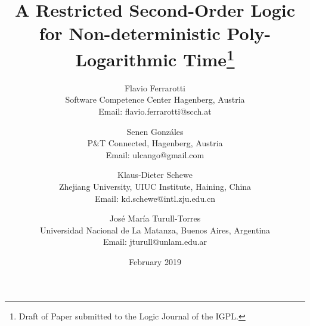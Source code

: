 \documentclass{article}
\begin{document}
\title{A Restricted Second-Order Logic for Non-deterministic Poly-Logarithmic Time\footnote{Draft of Paper submitted to the Logic Journal of the IGPL.}}


\author{Flavio Ferrarotti\\
Software Competence Center Hagenberg, Austria \\
Email: flavio.ferrarotti@scch.at\\
\and
Senen Gonz\'{a}les\\
P\&T Connected, Hagenberg, Austria \\
Email: ulcango@gmail.com\\
\and
Klaus-Dieter Schewe\\
Zhejiang University, UIUC Institute, Haining, China\\
Email: kd.schewe@intl.zju.edu.cn\\
\and
Jos\'{e} Mar\'{i}a Turull-Torres\\
Universidad Nacional de La Matanza, Buenos Aires, Argentina\\
Email: jturull@unlam.edu.ar}

\date{February 2019}




\maketitle
\end{document}
